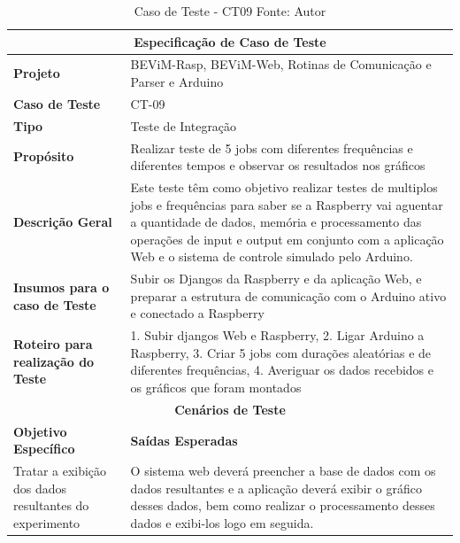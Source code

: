 \begin{table}[H]
    \begin{center}
        \begin{tabular}{|p{5cm}|p{12cm}|}
            \hline
            \multicolumn{2}{|c|}{\textbf{Especificação de Caso de Teste}} \\ \hline
                \textbf{Projeto}                                        & BEViM-Rasp, BEViM-Web, Rotinas de Comunicação e Parser e Arduino\\ \hline
                \textbf{Caso de Teste}                             & CT-09 \\ \hline
                \textbf{Tipo}                                             & Teste de Integração \\ \hline
                \textbf{Propósito}                                     & Realizar teste de 5 jobs com diferentes frequências e diferentes tempos e observar os resultados nos gráficos \\ \hline
                \textbf{Descrição Geral}                           & Este teste têm como objetivo realizar testes de multiplos jobs e frequências para saber se a Raspberry vai aguentar a quantidade de dados, memória e processamento das operações de input  e output em conjunto com a aplicação Web e o sistema de controle simulado pelo Arduino. \\ \hline
                \textbf{Insumos para o caso de Teste}    & Subir os Djangos da Raspberry e da aplicação Web, e preparar a estrutura de comunicação com o Arduino ativo e conectado a Raspberry \\ \hline
                \textbf{Roteiro para realização do Teste}&  1. Subir djangos Web e Raspberry, 2. Ligar Arduino a Raspberry, 3. Criar 5 jobs com durações aleatórias e de diferentes frequências, 4. Averiguar os dados recebidos e os gráficos que foram montados  \\ \hline
            \multicolumn{2}{|c|}{\textbf{Cenários de Teste}} \\ \hline
                \textbf{Objetivo Específico}                      & \textbf{Saídas Esperadas} \\ \hline
                Tratar a exibição dos dados resultantes do experimento & O sistema web deverá preencher a base de dados com os dados resultantes e a aplicação deverá exibir o gráfico desses dados, bem como realizar o processamento desses dados e exibi-los logo em seguida. \\ \hline
        \end{tabular}
    \end{center}
    \caption[Caso de Teste - CT09]{Caso de Teste - CT09
    \protect Fonte: Autor}
    \label{CT-09}
\end{table}

